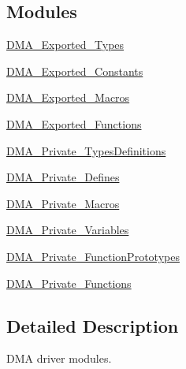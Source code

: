 \subsection*{Modules}
\begin{DoxyCompactItemize}
\item 
\hyperlink{group___d_m_a___exported___types}{D\+M\+A\+\_\+\+Exported\+\_\+\+Types}
\item 
\hyperlink{group___d_m_a___exported___constants}{D\+M\+A\+\_\+\+Exported\+\_\+\+Constants}
\item 
\hyperlink{group___d_m_a___exported___macros}{D\+M\+A\+\_\+\+Exported\+\_\+\+Macros}
\item 
\hyperlink{group___d_m_a___exported___functions}{D\+M\+A\+\_\+\+Exported\+\_\+\+Functions}
\item 
\hyperlink{group___d_m_a___private___types_definitions}{D\+M\+A\+\_\+\+Private\+\_\+\+Types\+Definitions}
\item 
\hyperlink{group___d_m_a___private___defines}{D\+M\+A\+\_\+\+Private\+\_\+\+Defines}
\item 
\hyperlink{group___d_m_a___private___macros}{D\+M\+A\+\_\+\+Private\+\_\+\+Macros}
\item 
\hyperlink{group___d_m_a___private___variables}{D\+M\+A\+\_\+\+Private\+\_\+\+Variables}
\item 
\hyperlink{group___d_m_a___private___function_prototypes}{D\+M\+A\+\_\+\+Private\+\_\+\+Function\+Prototypes}
\item 
\hyperlink{group___d_m_a___private___functions}{D\+M\+A\+\_\+\+Private\+\_\+\+Functions}
\end{DoxyCompactItemize}


\subsection{Detailed Description}
D\+MA driver modules. 

